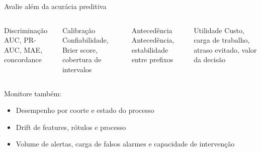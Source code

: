 \documentclass[aspectratio=169,11pt]{beamer}
\begin{document}
\begin{frame}{Avalie além da acurácia preditiva}
  \begin{columns}[T,onlytextwidth]
      \begin{block}{Discriminação}
        AUC, PR-AUC, MAE, concordance
      \end{block}
      \begin{block}{Calibração}
        Confiabilidade, Brier score, cobertura de intervalos
      \end{block}
      \begin{block}{Antecedência}
        Antecedência, estabilidade entre prefixos
      \end{block}
      \begin{block}{Utilidade}
        Custo, carga de trabalho, atraso evitado, valor da decisão
      \end{block}
  \end{columns}
  \vspace{0.5cm}
  Monitore também:
  \begin{itemize}
    \item Desempenho por coorte e estado do processo
    \item Drift de features, rótulos e processo
    \item Volume de alertas, carga de falsos alarmes e capacidade de intervenção
  \end{itemize}
\end{frame}
\end{document}
